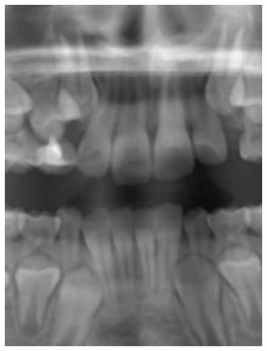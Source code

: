 \documentclass[a4paper,titlepage,12pt]{article}
\begin{document}
\begin{figure}
\begin{minipage}[b]{0.23\linewidth}
		\includegraphics[width=\linewidth]{preprocess/bilateral.png}
	\end{minipage}
	\begin{minipage}[b]{0.23\linewidth}

\end{minipage}
\end{figure}
\end{document}
